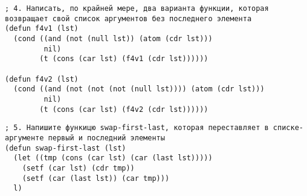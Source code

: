 \documentclass[a4paper,oneside,14pt]{extarticle}
\begin{document}
\begin{lstlisting}
; 4. Написать, по крайней мере, два варианта функции, которая возвращает свой список аргументов без последнего элемента
(defun f4v1 (lst)
  (cond ((and (not (null lst)) (atom (cdr lst)))
         nil)
        (t (cons (car lst) (f4v1 (cdr lst))))))

(defun f4v2 (lst)
  (cond ((and (not (not (not (null lst)))) (atom (cdr lst)))
         nil)
        (t (cons (car lst) (f4v2 (cdr lst))))))
\end{lstlisting}

\begin{lstlisting}
; 5. Напишите функицю swap-first-last, которая переставляет в списке-аргументе первый и последний элементы
(defun swap-first-last (lst)
  (let ((tmp (cons (car lst) (car (last lst)))))
    (setf (car lst) (cdr tmp))
    (setf (car (last lst)) (car tmp)))
  l)
\end{lstlisting}
\end{document}
